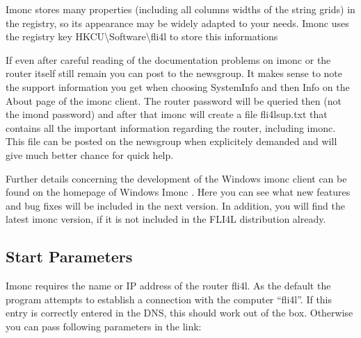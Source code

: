   Imonc stores many properties (including all columns widths of the string grids)
  in the registry, so its appearance may be widely adapted to your needs. Imonc
  uses the registry key HKCU{\textbackslash}Software{\textbackslash}fli4l
  to store this informations

  If even after careful reading of the documentation problems on imonc or the
  router itself still remain you can post to the newsgroup. It makes sense
  to note the support information you get when choosing SystemInfo and then Info
  on the About page of the imonc client. The router password will be queried
  then (not the imond password) and after that imonc will create a file fli4lsup.txt
  that contains all the important information regarding the router, including
  imonc. This file can be posted on the newsgroup when explicitely demanded
  and will give much better chance for quick help.

  Further details concerning the development of the Windows imonc client can be found
  on the homepage of Windows Imonc . Here you can
  see what new features and bug fixes will be included in the next version.
  In addition, you will find the latest imonc version, if it is not included
  in the FLI4L distribution already.

  \subsection{Start Parameters}

  Imonc requires the name or IP address of the router fli4l. As the default
  the program attempts to establish a connection with the computer ``fli4l''.
  If this entry is correctly entered in the DNS, this should work out of the box.
  Otherwise you can pass following parameters in the link:

